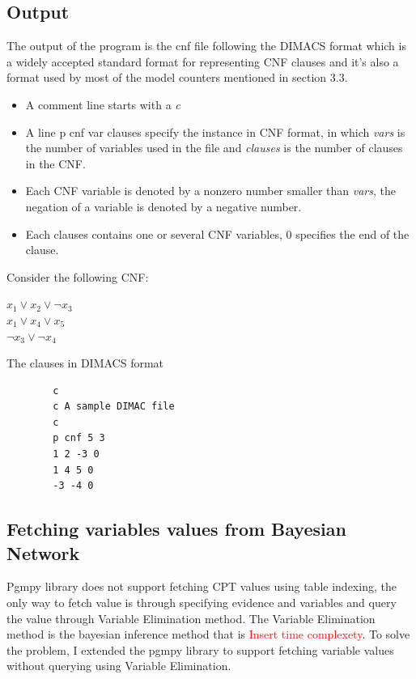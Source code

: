     \subsection{Output}
    The output of the program is the cnf file following the DIMACS format which is a widely accepted standard format for representing CNF clauses and it's also a format used by most of the model counters mentioned in section 3.3.\\
    \begin{itemize}
        \item A comment line starts with a \textit{c}
        \item A line p cnf var clauses specify the instance in CNF format, in which \textit{vars} is the number of variables used in the file and \textit{clauses} is the number of clauses in the CNF.
        \item Each CNF variable is denoted by a non\-zero number smaller than \textit{vars}, the negation of a variable is denoted by a negative number.
        \item Each clauses contains one or several CNF variables, 0 specifies the end of the clause.
    \end{itemize}
    
    Consider the following CNF:
    \begin{center}
        $x_{1} \vee x_{2} \vee \neg x_{3}$\\
        $x_{1} \vee x_{4} \vee x_{5}$\\
        $\neg x_{3} \vee \neg x_{4}$\\  
    \end{center}
    The clauses in DIMACS format\\
    \begin{center}
        \begin{lstlisting}
        c
        c A sample DIMAC file
        c
        p cnf 5 3
        1 2 -3 0
        1 4 5 0
        -3 -4 0
        \end{lstlisting}
    \end{center}
    
    \subsection{Fetching variables values from Bayesian Network}
    Pgmpy library does not support fetching CPT values using table indexing, the only way to fetch value is through specifying evidence and variables and query the value through Variable Elimination method. The Variable Elimination method is the bayesian inference method that is \textcolor{red}{Insert time complexety}. To solve the problem, I extended the pgmpy library to support fetching variable values without querying using Variable Elimination.\\
    
